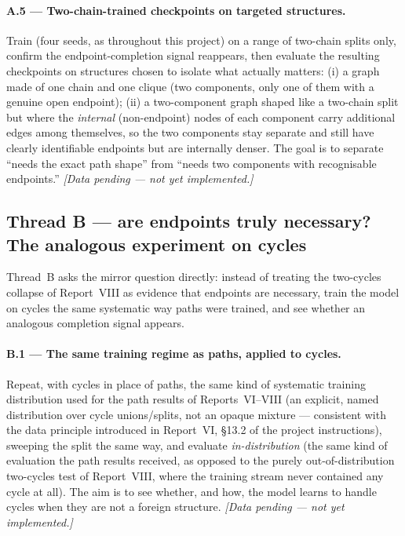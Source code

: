 \documentclass[11pt,a4paper]{article}
\begin{document}
\paragraph{A.5 --- Two-chain-trained checkpoints on targeted structures.} Train (four seeds, as
throughout this project) on a range of two-chain splits only, confirm the endpoint-completion
signal reappears, then evaluate the resulting checkpoints on structures chosen to isolate what
actually matters: (i) a graph made of one chain and one clique (two components, only one of
them with a genuine open endpoint); (ii) a two-component graph shaped like a two-chain split but
where the \emph{internal} (non-endpoint) nodes of each component carry additional edges among
themselves, so the two components stay separate and still have clearly identifiable endpoints
but are internally denser. The goal is to separate ``needs the exact path shape'' from ``needs
two components with recognisable endpoints.''
\emph{[Data pending --- not yet implemented.]}

\subsection{Thread B --- are endpoints truly necessary? The analogous experiment on cycles}
\label{sec:planB}

Thread~B asks the mirror question directly: instead of treating the two-cycles collapse of
Report~VIII as evidence that endpoints are necessary, train the model on cycles the same
systematic way paths were trained, and see whether an analogous completion signal appears.

\paragraph{B.1 --- The same training regime as paths, applied to cycles.} Repeat, with cycles
in place of paths, the same kind of systematic training distribution used for the path results
of Reports~VI--VIII (an explicit, named distribution over cycle unions/splits, not an opaque
mixture --- consistent with the data principle introduced in Report~VI, \S13.2 of the project
instructions), sweeping the split the same way, and evaluate \emph{in-distribution} (the same
kind of evaluation the path results received, as opposed to the purely out-of-distribution
two-cycles test of Report~VIII, where the training stream never contained any cycle at all).
The aim is to see whether, and how, the model learns to handle cycles when they are not a
foreign structure.
\emph{[Data pending --- not yet implemented.]}
\end{document}
